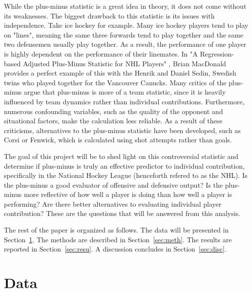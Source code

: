 \documentclass[12pt]{article}
\begin{document}
While the plus-minus statistic is a great idea in theory, it does not come without its weaknesses. The biggest drawback to this
statistic is its issues with independence. Take ice hockey for example. Many ice hockey players tend to play on "lines", meaning the same three 
forwards tend to play together and the same two defensemen usually play together. As a result, the performance of one player is highly dependent 
on the performance of their linemates. In "A Regression-based Adjusted Plus-Minus Statistic for NHL Players" \cite{Macdonald_2011}, Brian
MacDonald provides a perfect example of this with the Henrik and Daniel Sedin, Swedish twins who played together for the Vancouver Canucks. 
 \cite[Daniel spent 92\% of his playing time with Henrik, the highest percentage of any other player combination where both players have
played over 700 minutes. Because of this high collinearity between the twins, it is difficult to separate the individual effect that each 
player has on the net goals scored on the ice.]{Macdonald_2012} Many critics of the plus-minus argue that plus-minus is more of a team 
statistic, since it is heavily influenced by team dynamics rather than individual contributions. Furthermore, numerous confounding variables, 
such as the quality of the opponent and situational factors, make the calculation less reliable. As a result of these criticisms, alternatives 
to the plus-minus statistic have been developed, such as Corsi or Fenwick, which is calculated using shot attempts rather than goals.

The goal of this project will be to shed light on this controversial statistic and determine if plus-minus is truly an effective predictor
to individual contribution, specifically in the National Hockey League (henceforth refered to as the NHL). Is the plus-minus a good evaluator 
of offensive and defensive output? Is the plus-minus more reflective of how well a player is doing than how well a player is performing? 
Are there better alternatives to evaluating individual player contribution? These are the questions that will be answered from this analysis.


The rest of the paper is organized as follows.
The data will be presented in Section~\ref{sec:data}.
The methods are described in Section~\ref{sec:meth}.
The results are reported in Section~\ref{sec:resu}.
A discussion concludes in Section~\ref{sec:disc}.


\section{Data}
\label{sec:data}
\end{document}
